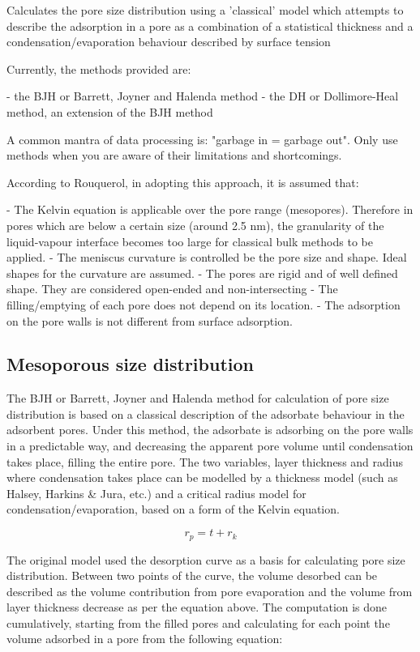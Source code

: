 
Calculates the pore size distribution using a 'classical' model which attempts to
describe the adsorption in a pore as a combination of a statistical thickness and
a condensation/evaporation behaviour described by surface tension

Currently, the methods provided are:

    - the BJH or Barrett, Joyner and Halenda method
    - the DH or Dollimore-Heal method, an extension of the BJH method

A common mantra of data processing is: "garbage in = garbage out". Only use methods
when you are aware of their limitations and shortcomings.

According to Rouquerol, in adopting this approach, it is assumed that:

    - The Kelvin equation is applicable over the pore range (mesopores). Therefore
    in pores which are below a certain size (around 2.5 nm), the granularity
    of the liquid-vapour interface becomes too large for classical bulk methods
    to be applied.
    - The meniscus curvature is controlled be the pore size and shape. Ideal shapes
    for the curvature are assumed.
    - The pores are rigid and of well defined shape. They are considered
    open-ended and non-intersecting
    - The filling/emptying of each pore does not depend on its location.
    - The adsorption on the pore walls is not different from surface adsorption.

\subsection{Mesoporous size distribution}


The BJH or Barrett, Joyner and Halenda method for calculation of pore size distribution
is based on a classical description of the adsorbate behaviour in the adsorbent pores.
Under this method, the adsorbate is adsorbing on the pore walls in a predictable way,
and decreasing the apparent pore volume until condensation takes place, filling the
entire pore. The two variables, layer thickness and radius where 
condensation takes place can be modelled by a thickness model
(such as Halsey, Harkins \& Jura, etc.) and a
critical radius model for condensation/evaporation, based on a form of the Kelvin equation.

\begin{equation}
    r_p = t + r_k
\end{equation}

The original model used the desorption curve as a basis for calculating pore size distribution.
Between two points of the curve, the volume desorbed can be described as the volume contribution
from pore evaporation and the volume from layer thickness decrease as per the equation
above. The computation is done cumulatively, starting from the filled pores and 
calculating for each point the volume adsorbed in a pore from the following equation:

